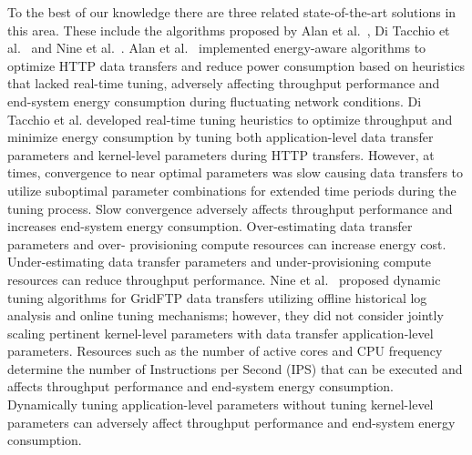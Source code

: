 \documentclass[conference]{IEEEtran}
\begin{document}
To the best of our knowledge there are three related state-of-the-art solutions in this area. These include the algorithms proposed by Alan et al.~\cite{alan2015energy}, Di Tacchio et al.~\cite{di2019cross} and Nine et al.~\cite{nine2018greendataflow}. Alan et al.~\cite{alan2015energy} implemented energy-aware algorithms to optimize HTTP data transfers and reduce power consumption based on heuristics that lacked real-time tuning, adversely affecting throughput performance and end-system energy consumption during fluctuating network conditions. Di Tacchio et al. developed real-time tuning heuristics to optimize throughput and minimize energy consumption by tuning both application-level data transfer parameters and kernel-level parameters during HTTP transfers. However, at times, convergence to near optimal parameters was slow causing data transfers to utilize suboptimal parameter combinations for extended time periods during the tuning process. Slow convergence adversely affects throughput performance and increases end-system energy consumption. Over-estimating data transfer parameters and over- provisioning compute resources can increase  energy cost. Under-estimating data transfer parameters and under-provisioning compute resources can reduce throughput performance. %
Nine et al.~\cite{nine2018greendataflow} proposed dynamic tuning algorithms for GridFTP data transfers utilizing offline historical log analysis and online tuning mechanisms; however, they did not consider jointly scaling pertinent kernel-level parameters with data transfer application-level parameters. Resources such as the number of active cores and CPU frequency determine the number of Instructions per Second (IPS) that can be executed and affects throughput performance and end-system energy consumption. Dynamically tuning application-level parameters without tuning kernel-level parameters can %
adversely affect throughput performance and end-system energy consumption.\par %
\end{document}

